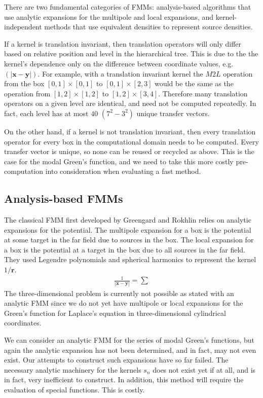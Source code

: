 \documentclass[11pt, oneside]{article}   	%
\begin{document}
There are two fundamental categories of FMMs: analysis-based algorithms that use analytic expansions for the multipole and local expansions, and kernel-independent methods that use equivalent densities to represent source densities.

If a kernel is translation invariant, then translation operators will only differ based on relative position and level in the hierarchical tree. This is due to the the kernel's dependence only on the difference between coordinate values, e.g. $(|\mathbf{x}-\mathbf{y}|)$. For example, with a translation invariant kernel the $M2L$ operation from the box $[0,1]\times[0,1]$ to $[0,1]\times[2,3]$ would be the same as the operation from $[1,2]\times[1,2]$ to $[1,2]\times[3,4]$. Therefore many translation operators on a given level are identical, and need not be computed repeatedly. In fact, each level has at most $40$ $(7^2-3^2)$ unique transfer vectors.

On the other hand, if a kernel is not translation invariant, then every translation operator for every box in the computational domain needs to be computed. Every transfer vector is unique, so none can be reused or recycled as above. This is the case for the modal Green's function, and we need to take this more costly pre-computation into consideration when evaluating a fast method.

\subsection{Analysis-based FMMs}

The classical FMM \cite{GR} first developed by Greengard and Rokhlin relies on analytic expansions for the potential. The multipole expansion for a box is the potential at some target in the far field due to sources in the box. The local expansion for a box is the potential at a target in the box due to all sources in the far field. They used Legendre polynomials and spherical harmonics to represent the kernel $1/\mathbf{r}$.
\begin{align}
\frac{1}{|\mathbf{x}-\mathbf{y}|} = \sum
\end{align}
The three-dimensional problem is currently not possible as stated with an analytic FMM since we do not yet have multipole or local expansions for the Green's function for Laplace's equation in three-dimensional cylindrical coordinates.

We can consider an analytic FMM for the series of modal Green's functions, but again the analytic expansion has not been determined, and in fact, may not even exist. Our attempts to construct such expansions have so far failed. The necessary analytic machinery for the kernels $s_n$ does not exist yet if at all, and is in fact, very inefficient to construct. In addition, this method will require the evaluation of special functions. This is costly.
\end{document}
